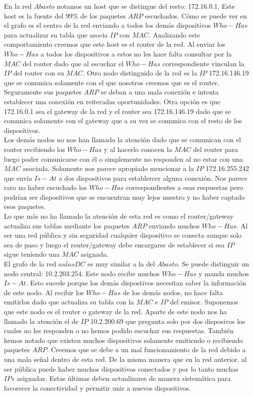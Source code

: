 \newpage
En la red $Abasto$ notamos un host que se distingue del resto: 172.16.0.1. Este host es la fuente del 99\% de los paquetes $ARP$ escuchados.
Cómo se puede ver en el grafo es el centro de la red enviando a todos los demás dispositivos $Who-Has$ para actualizar su tabla que asocia $IP$ con 
$MAC$. Analizando este comportamiento creemos que este host es el router de la red. Al enviar los $Who-Has$ a todos los dispositivos a estos no 
les hace falta consultar por la $MAC$ del router dado que al escuchar el $Who-Has$ correspondiente vinculan la $IP$ del router con su $MAC$. Otro nodo 
distinguido de la red es la $IP$ 172.16.146.19 que se comunica solamente con el que nosotros creemos que es el router. 
Seguramente sus paquetes $ARP$ se deban a una mala conexión e intenta establecer una conexión en reiteradas oportunidades. 
Otra opción es que 172.16.0.1 sea el gateway de la red y el router sea 172.16.146.19 dado que se comunica solamente con el gateway que a su vez
se comunica con el resto de los dispositivos.\\
Los demás nodos no nos han llamado la atención dado que se comunican con el router recibiendo los $Who-Has$ y al hacerlo conocen la $MAC$ del router
para luego poder comunicarse con él o simplemente no responden al no estar con una $MAC$ asociada. 
Solamente nos parece apropiado mencionar a la $IP$ 172.16.255.242 que envía $Is-At$ a dos dispositivos para establercer alguna conexión. Nos parece
raro no haber escuchado los $Who-Has$ correspondientes a esas respuestas pero podrían ser dispositivos que se encuentran muy lejos nuestro y 
no haber captado esos paquetes.\\
Lo que más no ha llamado la atención de esta red es como el router/gateway actualiza sus tablas mediante los paquetes $ARP$ enviando muchos $Who-Has$. 
Al ser una red pública y sin seguridad cualquier dispositivo se conecta aunque solo sea de paso y luego el router/gateway debe 
encargarse de establecer si esa $IP$ sigue teniendo una $MAC$ asignada.\\


El grafo de la red $aulasDC$ es muy similar a la del $Abasto$. Se puede distinguir un nodo central: 10.2.203.254. 
Este nodo recibe muchos $Who-Has$ y manda muchos $Is-At$. Esto sucede porque los demás dispostivos necesitan saber la información de este nodo.
Al recibir los $Who-Has$ de los demás nodos, no hace falta emitirlos dado que actualiza su tabla con la $MAC$ e $IP$ del emisor. Suponemos que este 
nodo es el router o gateway de la red. Aparte de este nodo nos ha llamado la atención el de $IP$ 10.2.200.69 que pregunta solo por dos disposivos
los cuales no les responden o no hemos podido escuchar sus respuestas. También hemos notado que existen muchos dispositivos solamente emitiendo o 
recibiendo paquetes $ARP$. Creemos que se debe a un mal funcionamiento de la red debido a una mala señal dentro de esta red. De la misma manera que 
en la red anterior, al ser pública puede haber muchos dispositivos conectados y por lo tanto muchas $IPs$ asignadas. Estas últimas deben actualizarse 
de manera sistemática para favorecer la conectividad y permitir unir a nuevos dispositivos.\\	


